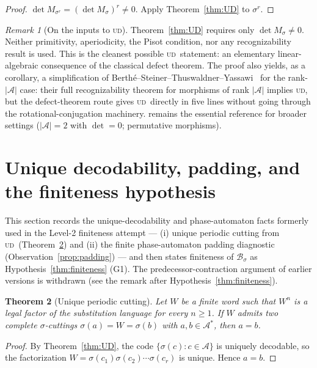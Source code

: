 \documentclass[11pt]{article}
\theoremstyle{plain}
\newtheorem{theorem}{Theorem}[section]
\theoremstyle{definition}
\theoremstyle{remark}
\newtheorem{remark}[theorem]{Remark}
\newcommand{\UD}{\textsc{ud}}
\newcommand{\A}{\mathcal{A}}
\newcommand{\B}{\mathcal{B}}
\begin{document}
\begin{proof}
$\det M_{\sigma^r}=(\det M_\sigma)^r\ne 0$. Apply Theorem~\ref{thm:UD} to $\sigma^r$.
\end{proof}

\begin{remark}[On the inputs to \UD]\label{rem:UD-inputs}
Theorem~\ref{thm:UD} requires only $\det M_\sigma\ne 0$. Neither primitivity, aperiodicity, the Pisot condition, nor any recognizability result is used. This is the cleanest possible \UD\ statement: an elementary linear-algebraic consequence of the classical defect theorem. The proof also yields, as a corollary, a simplification of Berth\'e--Steiner--Thuswaldner--Yassawi~\cite[Thm 3.1]{BSTY} for the rank-$|\A|$ case: their full recognizability theorem for morphisms of rank $|\A|$ implies \UD, but the defect-theorem route gives \UD\ directly in five lines without going through the rotational-conjugation machinery. \cite{BSTY} remains the essential reference for broader settings ($|\A|=2$ with $\det=0$; permutative morphisms).
\end{remark}

\section{Unique decodability, padding, and the finiteness hypothesis}\label{sec:finiteness}

This section records the unique-decodability and phase-automaton facts formerly used in the Level-2 finiteness attempt --- (i) unique periodic cutting from \UD\ (Theorem~\ref{thm:upc}) and (ii) the finite phase-automaton padding diagnostic (Observation~\ref{prop:padding}) --- and then states finiteness of $\B_\sigma$ as Hypothesis~\ref{thm:finiteness} (G1). The predecessor-contraction argument of earlier versions is withdrawn (see the remark after Hypothesis~\ref{thm:finiteness}).

\begin{theorem}[Unique periodic cutting]\label{thm:upc}
Let $W$ be a finite word such that $W^n$ is a legal factor of the substitution language for every $n\ge 1$. If $W$ admits two complete $\sigma$-cuttings $\sigma(a)=W=\sigma(b)$ with $a,b\in\A^*$, then $a=b$.
\end{theorem}

\begin{proof}
By Theorem~\ref{thm:UD}, the code $\{\sigma(c):c\in\A\}$ is uniquely decodable, so the factorization $W=\sigma(c_1)\sigma(c_2)\cdots\sigma(c_r)$ is unique. Hence $a=b$.
\end{proof}
\end{document}
